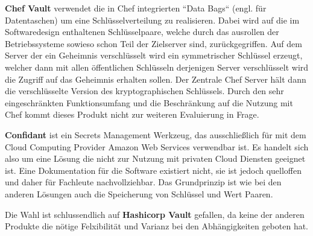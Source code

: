 \documentclass[
book,
a4paper,   
titlepage,  
halfparskip,
12pt        
]{scrartcl}
\begin{document}
\begin{onehalfspacing}
\textbf{Chef Vault} verwendet die in Chef integrierten ``Data Bags`` (engl. für Datentaschen) um eine Schlüsselverteilung zu realisieren. Dabei wird auf die im Softwaredesign enthaltenen Schlüsselpaare, welche durch das ausrollen der Betriebssysteme sowieso schon Teil der Zielserver sind, zurückgegriffen. Auf dem Server der ein Geheimnis verschlüsselt wird ein symmetrischer Schlüssel erzeugt, welcher dann mit allen öffentlichen Schlüsseln derjenigen Server verschlüsselt wird die Zugriff auf das Geheimnis erhalten sollen. Der Zentrale Chef Server hält dann die verschlüsselte Version des kryptographischen Schlüssels.\cite{chef} Durch den sehr eingeschränkten Funktionsumfang und die Beschränkung auf die Nutzung mit Chef kommt dieses Produkt nicht zur weiteren Evaluierung in Frage.

\textbf{Confidant} ist ein Secrets Management Werkzeug, das ausschließlich für mit dem Cloud Computing Provider Amazon Web Services verwendbar ist. Es handelt sich also um eine Lösung die nicht zur Nutzung mit privaten Cloud Diensten geeignet ist. Eine Dokumentation für die Software existiert nicht, sie ist jedoch quelloffen und daher für Fachleute nachvollziehbar. Das Grundprinzip ist wie bei den anderen Lösungen auch die Speicherung von Schlüssel und Wert Paaren.\cite{lyft}

Die Wahl ist schlussendlich auf \textbf{Hashicorp Vault} gefallen, da keine der anderen Produkte die nötige Felxibilität und Varianz bei den Abhängigkeiten geboten hat. 


\end{onehalfspacing}
\end{document}
